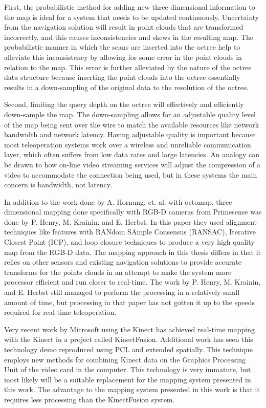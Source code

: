 \documentclass[12pt]{report}
\begin{document}
First, the probabilistic method for adding new three dimensional information to the map is ideal for a system that needs to be updated continuously.  Uncertainty from the navigation solution will result in point clouds that are transformed incorrectly, and this causes inconsistencies and skews in the resulting map. The probabilistic manner in which the scans are inserted into the octree help to alleviate this inconsistency by allowing for some error in the point clouds in relation to the map. This error is further alleviated by the nature of the octree data structure because inserting the point clouds into the octree essentially results in a down-sampling of the original data to the resolution of the octree.

Second, limiting the query depth on the octree will effectively and efficiently down-sample the map.  The down-sampling allows for an adjustable quality level of the map being sent over the wire to match the available resources like network bandwidth and network latency.  Having adjustable quality is important because most teleoperation systems work over a wireless and unreliable communication layer, which often suffers from low data rates and large latencies.  An analogy can be drawn to how on-line video streaming services will adjust the compression of a video to accommodate the connection being used, but in these systems the main concern is bandwidth, not latency.

In addition to the work done by A. Hornung, et. al. with octomap, three dimensional mapping done specifically with RGB-D cameras from Primesense was done by P. Henry, M. Krainin, and E. Herbst\cite{Henry2010}.  In this paper they used alignment techniques like features with RANdom SAmple Consensus (RANSAC), Iterative Closest Point (ICP), and loop closure techniques to produce a very high quality map from the RGB-D data\cite{Henry2010}.  The mapping approach in this thesis differs in that it relies on other sensors and existing navigation solutions to provide accurate transforms for the points clouds in an attempt to make the system more processor efficient and run closer to real-time.  The work by P. Henry, M. Krainin, and E. Herbst still managed to perform the processing in a relatively small amount of time, but processing in that paper has not gotten it up to the speeds required for real-time teleoperation.

Very recent work by Microsoft using the Kinect has achieved real-time mapping with the Kinect in a project called KinectFusion\cite{izadi2011kinectfusion}.  Additional work has seen this technology demo reproduced using PCL and extended spatially\cite{whelankintinuous}.  This technique employs new methods for combining Kinect data on the Graphics Processing Unit of the video card in the computer.  This technology is very immature, but most likely will be a suitable replacement for the mapping system presented in this work.  The advantage to the mapping system presented in this work is that it requires less processing than the KinectFusion system.
\end{document}
